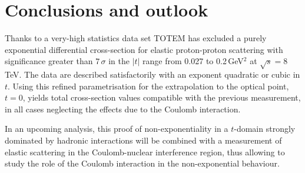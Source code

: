 
\section{Conclusions and outlook}
\label{sec:conclusions}
%
Thanks to a very-high statistics data set TOTEM has excluded a purely exponential differential 
cross-section for elastic proton-proton scattering with significance greater than $7\,\sigma$
in the $|t|$ range from 0.027 to 0.2\,GeV$^{2}$ at $\sqrt{s}=8\,$TeV. The data
are described satisfactorily with an exponent quadratic or cubic in $t$.
Using this refined parametrisation for the extrapolation to the optical point,
$t = 0$, yields total cross-section values compatible with the previous measurement, in all cases
neglecting the effects due to the Coulomb interaction.

In an upcoming analysis, this proof of non-exponentiality in a 
$t$-domain strongly dominated by hadronic interactions will be combined with a measurement of 
elastic scattering in the Coulomb-nuclear interference region,
thus allowing to study the role of the Coulomb interaction in the non-exponential behaviour.
